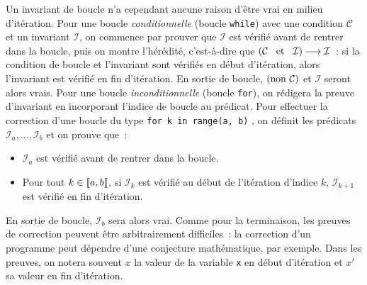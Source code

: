\documentclass{magnolia}
\begin{document}
\begin{remarques}
\remarque Un invariant de boucle n'a cependant aucune raison d'être vrai en milieu
  d'itération.
  \remarque Pour une boucle \emph{conditionnelle} (boucle \verb!while!) avec une
  condition $\mathcal{C}$ et un invariant $\mathcal{I}$, on commence par prouver
  que $\mathcal{I}$ est vérifié avant de rentrer dans la boucle, puis on montre
  l'hérédité, c'est-à-dire que
  $(\mathcal{C} \quad\!\text{et}\quad\! \mathcal{I}) \longrightarrow \mathcal{I}$~: si la condition de boucle et l'invariant sont
  vérifiés en début d'itération, alors l'invariant est vérifié en fin
  d'itération. En sortie de boucle, $({\rm non}\  \mathcal{C})$ et $\mathcal{I}$
  seront alors vrais.
\remarque Pour une boucle \emph{inconditionnelle} (boucle \verb!for!), on rédigera
  la preuve d'invariant en incorporant l'indice de boucle au prédicat.
  Pour effectuer la correction d'une boucle du type \og \verb!for k in range(a, b)! \fg, on définit les
  prédicats $\mathcal{I}_a,\ldots,\mathcal{I}_b$ et on prouve que~:
  \begin{itemize}
  \item $\mathcal{I}_a$ est vérifié avant de rentrer dans la boucle.
  \item Pour tout $k\in\left\llbracket a,b\right\llbracket$, si $\mathcal{I}_k$ est vérifié au début de l'itération d'indice $k$, $\mathcal{I}_{k+1}$
  est vérifié en fin d'itération.
  \end{itemize}
   En sortie de boucle, $\mathcal{I}_b$ sera alors vrai.
  \remarque
  Comme pour la terminaison, les preuves de correction peuvent
  être arbitrairement difficiles~: la correction d'un programme
  peut dépendre d'une conjecture mathématique, par exemple.
  \remarque Dans les preuves, on notera souvent $x$ la valeur de la variable \verb!x! en début
    d'itération et $x'$ sa valeur en fin d'itération.
\end{remarques}
\end{document}
